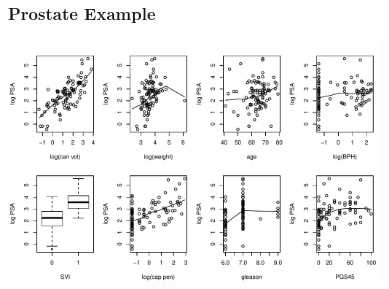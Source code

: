 \documentclass[handout]{beamer}\usepackage[]{graphicx}\usepackage[]{color}
\begin{document}
\begin{frame}[fragile]
  \frametitle{Prostate Example}
 \begin{center}
 \includegraphics[height=2.5in]{prostfig1}

 \end{center}

\end{frame}
\end{document}

